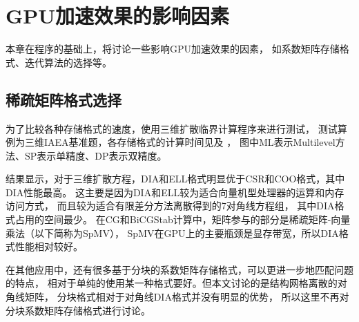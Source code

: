 

\chapter{GPU加速效果的影响因素}

本章在\ProgramName 程序的基础上，将讨论一些影响GPU加速效果的因素，
如系数矩阵存储格式、迭代算法的选择等。

\section{稀疏矩阵格式选择}

为了比较各种存储格式的速度，使用三维扩散临界计算程序来进行测试，
测试算例为三维IAEA基准题，各存储格式的计算时间见及
，
图中ML表示Multilevel方法、SP表示单精度、DP表示双精度。

结果显示，对于三维扩散方程，DIA和ELL格式明显优于CSR和COO格式，其中DIA性能最高。
这主要是因为DIA和ELL较为适合向量机型处理器的运算和内存访问方式，
而且较为适合有限差分方法离散得到的7对角线方程组，
其中DIA格式占用的空间最少。
在CG和BiCGStab计算中，矩阵参与的部分是稀疏矩阵-向量乘法（以下简称为SpMV），
SpMV在GPU上的主要瓶颈是显存带宽\cite{bell2008spmv,
baskaran2008optimizing}，所以DIA格式性能相对较好。

在其他应用中，还有很多基于分块的系数矩阵存储格式，可以更进一步地匹配问题的特点，
相对于单纯的使用某一种格式要好。但本文讨论的是结构网格离散的对角线矩阵，
分块格式相对于对角线DIA格式并没有明显的优势，
所以这里不再对分块系数矩阵存储格式进行讨论。

